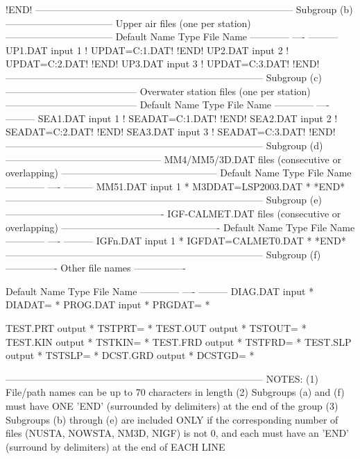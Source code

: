 \documentclass[a4paper,10pt]{article}
\begin{document}
                       !END!
--------------------------------------------------------------------------------
Subgroup (b)
---------------------------------
Upper air files (one per station)
---------------------------------
Default Name  Type       File Name
------------  ----       ---------
UP1.DAT       input     1  ! UPDAT=C:\CALPUFF\TESTCASE\UP1.DAT!    !END!
UP2.DAT       input     2  ! UPDAT=C:\CALPUFF\TESTCASE\UP2.DAT!    !END!
UP3.DAT       input     3  ! UPDAT=C:\CALPUFF\TESTCASE\UP3.DAT!    !END!
--------------------------------------------------------------------------------
Subgroup (c)
-----------------------------------------
Overwater station files (one per station)
-----------------------------------------
Default Name  Type       File Name
------------  ----       ---------
SEA1.DAT       input     1  ! SEADAT=C:\CALPUFF\TESTCASE\SEA1.DAT!    !END!
SEA2.DAT       input     2  ! SEADAT=C:\CALPUFF\TESTCASE\SEA2.DAT!    !END!
SEA3.DAT       input     3  ! SEADAT=C:\CALPUFF\TESTCASE\SEA3.DAT!    !END!
--------------------------------------------------------------------------------
Subgroup (d)
------------------------------------------------
MM4/MM5/3D.DAT files (consecutive or overlapping)
------------------------------------------------
Default Name  Type       File Name
------------  ----       ---------
MM51.DAT       input     1  * M3DDAT=LSP2003.DAT *    *END*
--------------------------------------------------------------------------------
Subgroup (e)
-------------------------------------------------
IGF-CALMET.DAT files (consecutive or overlapping)
-------------------------------------------------
Default Name  Type       File Name
------------  ----       ---------
IGFn.DAT       input     1  * IGFDAT=CALMET0.DAT *    *END*
--------------------------------------------------------------------------------
Subgroup (f)
----------------
Other file names
----------------

Default Name  Type       File Name
------------  ----       ---------
DIAG.DAT      input      * DIADAT=                  *
PROG.DAT      input      * PRGDAT=                  *

TEST.PRT      output     * TSTPRT=                  *
TEST.OUT      output     * TSTOUT=                  *
TEST.KIN      output     * TSTKIN=                  *
TEST.FRD      output     * TSTFRD=                  *
TEST.SLP      output     * TSTSLP=                  *
DCST.GRD      output     * DCSTGD=                  *

--------------------------------------------------------------------------------
NOTES: (1) File/path names can be up to 70 characters in length
       (2) Subgroups (a) and (f) must have ONE 'END' (surrounded by
           delimiters) at the end of the group
       (3) Subgroups (b) through (e) are included ONLY if the corresponding
           number of files (NUSTA, NOWSTA, NM3D, NIGF) is not 0, and each must have
           an 'END' (surround by delimiters) at the end of EACH LINE
\end{document}
